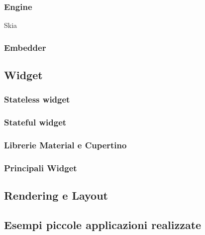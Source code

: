 \subsubsection{Engine}
Skia
\subsubsection{Embedder}

\subsection{Widget}

\subsubsection{Stateless widget}

\subsubsection{Stateful widget}

\subsubsection{Librerie Material e Cupertino}

\subsubsection{Principali Widget}

\subsection{Rendering e Layout}

\subsection{Esempi piccole applicazioni realizzate}
